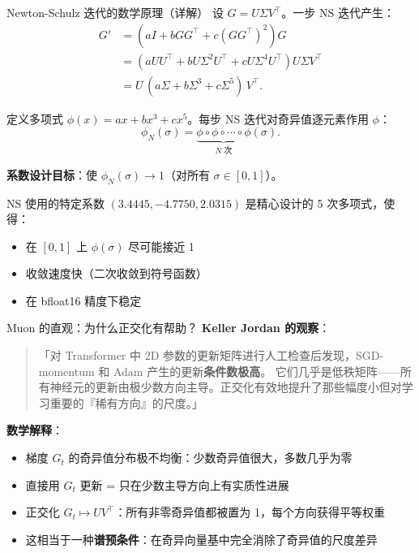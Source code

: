 \documentclass[aspectratio=169,10pt]{ctexbeamer}
\begin{document}
\begin{frame}{Newton-Schulz 迭代的数学原理（详解）}
设 $G=U\Sigma V^\top$。一步 NS 迭代产生：
\[
  \begin{aligned}
    G' &= (a I + b GG^\top + c (GG^\top)^2) G\\
    &= (a UU^\top + b U\Sigma^2 U^\top + c U\Sigma^4 U^\top) U\Sigma V^\top\\
    &= U\,(a\Sigma + b\Sigma^3 + c\Sigma^5)\,V^\top.
  \end{aligned}
\]

\vspace{0.15cm}
定义多项式 $\phi(x) = ax + bx^3 + cx^5$。每步 NS 迭代对奇异值逐元素作用 $\phi$：
\[
  \phi_N(\sigma) = \underbrace{\phi\circ\phi\circ\cdots\circ\phi}_{N\text{ 次}}(\sigma).
\]

\vspace{0.15cm}
\textbf{系数设计目标}：使 $\phi_N(\sigma)\to 1$（对所有 $\sigma\in[0,1]$）。

\vspace{0.15cm}
NS 使用的特定系数 $(3.4445, -4.7750, 2.0315)$ 是精心设计的 5 次多项式，使得：
\begin{itemize}
  \item 在 $[0,1]$ 上 $\phi(\sigma)$ 尽可能接近 1
  \item 收敛速度快（二次收敛到符号函数）
  \item 在 bfloat16 精度下稳定
\end{itemize}
\end{frame}

\begin{frame}{Muon 的直观：为什么正交化有帮助？}
\textbf{Keller Jordan 的观察}：
\begin{quote}
\small
「对 Transformer 中 2D 参数的更新矩阵进行人工检查后发现，SGD-momentum 和 Adam 产生的更新\textbf{条件数极高}。
它们几乎是低秩矩阵——所有神经元的更新由极少数方向主导。正交化有效地提升了那些幅度小但对学习重要的『稀有方向』的尺度。」
\end{quote}

\vspace{0.2cm}
\textbf{数学解释}：
\begin{itemize}
  \item 梯度 $G_t$ 的奇异值分布极不均衡：少数奇异值很大，多数几乎为零
  \item 直接用 $G_t$ 更新 = 只在少数主导方向上有实质性进展
  \item 正交化 $G_t\mapsto UV^\top$：所有非零奇异值都被置为 1，每个方向获得平等权重
  \item 这相当于一种\textbf{谱预条件}：在奇异向量基中完全消除了奇异值的尺度差异
\end{itemize}
\end{frame}
\end{document}
